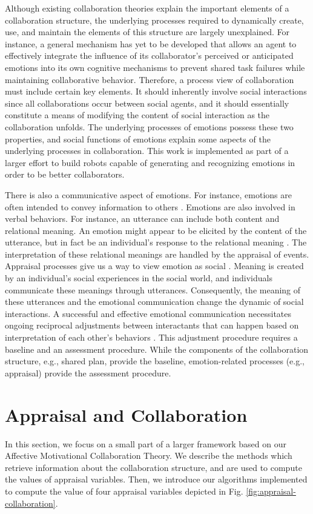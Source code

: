 \documentclass[12pt]{report}
\begin{document}
Although existing collaboration theories explain the important elements of a
collaboration structure, the underlying processes required to dynamically
create, use, and maintain the elements of this structure are largely
unexplained. For instance, a general mechanism has yet to be developed that
allows an agent to effectively integrate the influence of its collaborator's
perceived or anticipated emotions into its own cognitive mechanisms to prevent
shared task failures while maintaining collaborative behavior. Therefore, a
process view of collaboration must include certain key elements. It should
inherently involve social interactions since all collaborations occur between
social agents, and it should essentially constitute a means of modifying the
content of social interaction as the collaboration unfolds. The underlying
processes of emotions possess these two properties, and social functions of
emotions explain some aspects of the underlying processes in collaboration.
This work is implemented as part of a larger effort to build robots capable of
generating and recognizing emotions in order to be better collaborators.

There is also a communicative aspect of emotions. For instance, emotions are
often intended to convey information to others \cite{goffman:self-presentation}.
Emotions are also involved in verbal behaviors. For instance, an utterance can
include both content and relational meaning. An emotion might appear to be
elicited by the content of the utterance, but in fact be an individual's
response to the relational meaning \cite{planalp:communicating-emotion}. The
interpretation of these relational meanings are handled by the appraisal of
events. Appraisal processes give us a way to view emotion as social
\cite{hooft:sharing-emotions}. Meaning is created by an individual's social
experiences in the social world, and individuals communicate these meanings
through utterances. Consequently, the meaning of these utterances and the
emotional communication change the dynamic of social interactions. A successful
and effective emotional communication necessitates ongoing reciprocal
adjustments between interactants that can happen based on interpretation of each
other's behaviors \cite{parkinson:emotion-social-interaction}. This adjustment
procedure requires a baseline and an assessment procedure. While the components
of the collaboration structure, e.g., shared plan, provide the baseline,
emotion-related processes (e.g., appraisal) provide the assessment procedure.

\section{Appraisal and Collaboration}
In this section, we focus on a small part of a larger framework based on our
Affective Motivational Collaboration Theory. We describe the methods which
retrieve information about the collaboration structure, and are used to compute
the values of appraisal variables. Then, we introduce our algorithms implemented
to compute the value of four appraisal variables depicted in Fig.
\ref{fig:appraisal-collaboration}.
\end{document}
